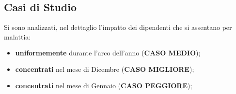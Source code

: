 \subsection[Casi di Studio]{Casi di Studio}
Si sono analizzati, nel dettaglio l'impatto dei dipendenti che si assentano per malattia:
\begin{itemize}
\item \textbf{uniformemente} durante l'arco dell'anno (\textbf{CASO MEDIO});
\item \textbf{concentrati} nel mese di Dicembre (\textbf{CASO MIGLIORE});
\item \textbf{concentrati} nel mese di Gennaio (\textbf{CASO PEGGIORE});
\end{itemize} 
%
%
\begin{comment}
\begin{savenotes}
\begin{table}[htb]
\centering
 \caption{Variazione VAN (Caso Teorico)}
 \begin{tabular}{p{4cm}D{,}{,}{5.2}D{,}{,}{5.2}D{,}{,}{5.2}D{,}{,}{7.4}}
 \toprule
 	& \multicolumn{1}{c}{Flusso di cassa mensile (\euro)} & \multicolumn{1}{c}{Contratti Mensili } &\multicolumn{1}{c}{\textbf{VAN}}&\multicolumn{1}{c}{\textbf{ \% Contratti}} \\
 \midrule	
 	\makebox[4cm][r]{Pareggio} & 65\thinspace 355,07 & 939,18 & 0,00 & 0,1154\\ 
	\makebox[4cm][r]{Ottimo} & 553\thinspace 419,36 & 8\thinspace 138,52 & 5\thinspace 248\thinspace 057,65 & 1,0000\\
	\makebox[4cm][r]{Caso di Studio 20,0 \%} & 110\thinspace 683,87 & 1\thinspace 627,70 & 487\thinspace 411,50 & 0,2000\\
	\makebox[4cm][r]{Caso di Studio 15,0 \%} & 83\thinspace 012,90 & 1\thinspace 220,78 & 189\thinspace 871,11 & 0,1500 \\
	\makebox[4cm][r]{Caso di Studio 12,5 \%} & 69\thinspace 177,42 & 1\thinspace 017,32 & 41\thinspace 100,92 & 0,1250 \\
 \bottomrule
 \end{tabular} 
\end{table}
\end{savenotes}
\end{comment}

